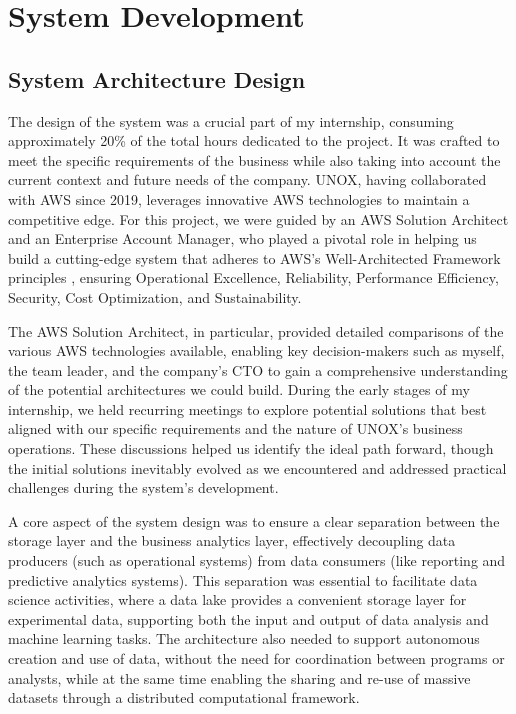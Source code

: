 \chapter{System Development}
\label{chp:project}

\section{System Architecture Design}
The design of the system was a crucial part of my internship, consuming approximately 20\% of the total hours dedicated to the project. It was crafted to meet the specific requirements of the business while also taking into account the current context and future needs of the company. UNOX, having collaborated with \ac{AWS} since 2019, leverages innovative \ac{AWS} technologies to maintain a competitive edge. For this project, we were guided by an \ac{AWS} Solution Architect and an Enterprise Account Manager, who played a pivotal role in helping us build a cutting-edge system that adheres to \ac{AWS}'s Well-Architected Framework principles \cite{awswell}, ensuring Operational Excellence, Reliability, Performance Efficiency, Security, Cost Optimization, and Sustainability.

The \ac{AWS} Solution Architect, in particular, provided detailed comparisons of the various \ac{AWS} technologies available, enabling key decision-makers such as myself, the team leader, and the company's CTO to gain a comprehensive understanding of the potential architectures we could build. During the early stages of my internship, we held recurring meetings to explore potential solutions that best aligned with our specific requirements and the nature of UNOX's business operations. These discussions helped us identify the ideal path forward, though the initial solutions inevitably evolved as we encountered and addressed practical challenges during the system's development.

A core aspect of the system design was to ensure a clear separation between the storage layer and the business analytics layer, effectively decoupling data producers (such as operational systems) from data consumers (like reporting and predictive analytics systems). This separation was essential to facilitate data science activities, where a data lake provides a convenient storage layer for experimental data, supporting both the input and output of data analysis and machine learning tasks. The architecture also needed to support autonomous creation and use of data, without the need for coordination between programs or analysts, while at the same time enabling the sharing and re-use of massive datasets through a distributed computational framework.

